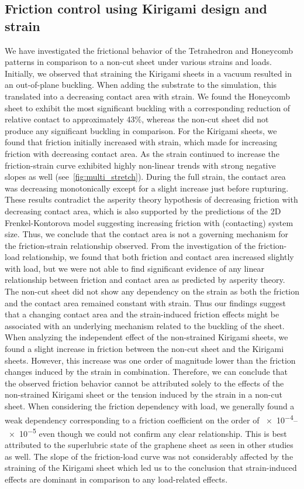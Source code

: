 \subsection{Friction control using Kirigami design and strain}
We have investigated the frictional behavior of the Tetrahedron and Honeycomb
patterns in comparison to a non-cut sheet under various strains and loads.
Initially, we observed that straining the Kirigami sheets in a vacuum resulted
in an out-of-plane buckling. When adding the substrate to the simulation, this
translated into a decreasing contact area with strain. We found the Honeycomb
sheet to exhibit the most significant buckling with a corresponding reduction of
relative contact to approximately 43\%, whereas the non-cut sheet did not
produce any significant buckling in comparison. For the Kirigami sheets, we
found that friction initially increased with strain, which made for increasing
friction with decreasing contact area. As the strain continued to increase the
friction-strain curve exhibited highly non-linear trends with strong negative
slopes as well (see~\cref{fig:multi_stretch}). During the full strain, the
contact area was decreasing monotonically except for a slight increase just
before rupturing. These results contradict the asperity theory hypothesis of
decreasing friction with decreasing contact area, which is also supported by the
predictions of the 2D Frenkel-Kontorova model suggesting increasing friction
with (contacting) system size. Thus, we conclude that the contact area is not a
governing mechanism for the friction-strain relationship observed. From the
investigation of the friction-load relationship, we found that both friction and
contact area increased slightly with load, but we were not able to find
significant evidence of any linear relationship between friction and contact
area as predicted by asperity theory. The non-cut sheet did not show any
dependency on the strain as both the friction and the contact area remained
constant with strain. Thus our findings suggest that a changing contact area and
the strain-induced friction effects might be associated with an underlying
mechanism related to the buckling of the sheet. When analyzing the independent
effect of the non-strained Kirigami sheets, we found a slight increase in
friction between the non-cut sheet and the Kirigami sheets. However, this
increase was one order of magnitude lower than the friction changes induced by
the strain in combination. Therefore, we can conclude that the observed friction
behavior cannot be attributed solely to the effects of the non-strained Kirigami
sheet or the tension induced by the strain in a non-cut sheet. When considering the friction dependency with load, we generally found a weak
dependency corresponding to a friction coefficient on the order of
\num{e-4}--\num{e-5} even though we could not confirm any clear relationship.
This is best attributed to the superlubric state of the graphene sheet as seen in
other studies as well. The slope of the friction-load curve was not considerably
affected by the straining of the Kirigami sheet which led us to the conclusion
that strain-induced effects are dominant in comparison to any load-related
effects. 


